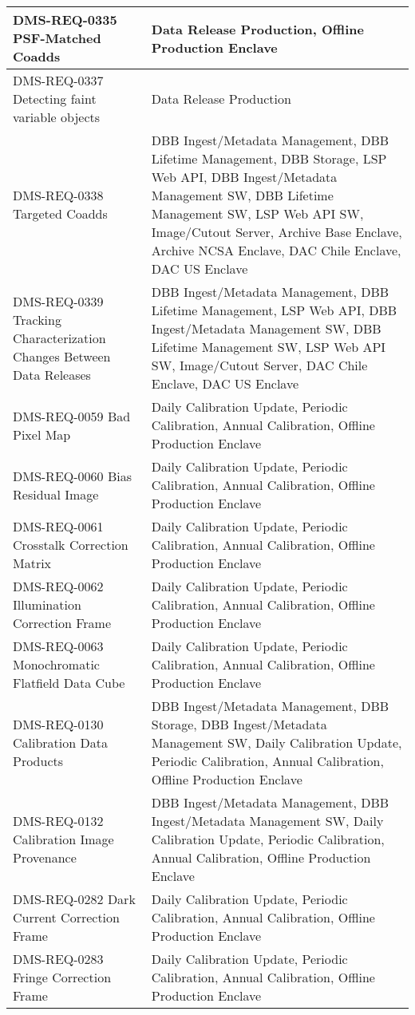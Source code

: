 \begin{xtabular}{p{0.4\textwidth}p{0.55\textwidth}}
DMS-REQ-0335 PSF-Matched Coadds & Data Release Production, Offline Production Enclave \\ \hline
DMS-REQ-0337 Detecting faint variable objects & Data Release Production \\ \hline
DMS-REQ-0338 Targeted Coadds & DBB Ingest/Metadata Management, DBB Lifetime Management, DBB Storage, LSP Web API, DBB Ingest/Metadata Management SW, DBB Lifetime Management SW, LSP Web API SW, Image/Cutout Server, Archive Base Enclave, Archive NCSA Enclave, DAC Chile Enclave, DAC US Enclave \\ \hline
DMS-REQ-0339 Tracking Characterization Changes Between Data Releases & DBB Ingest/Metadata Management, DBB Lifetime Management, LSP Web API, DBB Ingest/Metadata Management SW, DBB Lifetime Management SW, LSP Web API SW, Image/Cutout Server, DAC Chile Enclave, DAC US Enclave \\ \hline
DMS-REQ-0059 Bad Pixel Map & Daily Calibration Update, Periodic Calibration, Annual Calibration, Offline Production Enclave \\ \hline
DMS-REQ-0060 Bias Residual Image & Daily Calibration Update, Periodic Calibration, Annual Calibration, Offline Production Enclave \\ \hline
DMS-REQ-0061 Crosstalk Correction Matrix & Daily Calibration Update, Periodic Calibration, Annual Calibration, Offline Production Enclave \\ \hline
DMS-REQ-0062 Illumination Correction Frame & Daily Calibration Update, Periodic Calibration, Annual Calibration, Offline Production Enclave \\ \hline
DMS-REQ-0063 Monochromatic Flatfield Data Cube & Daily Calibration Update, Periodic Calibration, Annual Calibration, Offline Production Enclave \\ \hline
DMS-REQ-0130 Calibration Data Products & DBB Ingest/Metadata Management, DBB Storage, DBB Ingest/Metadata Management SW, Daily Calibration Update, Periodic Calibration, Annual Calibration, Offline Production Enclave \\ \hline
DMS-REQ-0132 Calibration Image Provenance & DBB Ingest/Metadata Management, DBB Ingest/Metadata Management SW, Daily Calibration Update, Periodic Calibration, Annual Calibration, Offline Production Enclave \\ \hline
DMS-REQ-0282 Dark Current Correction Frame & Daily Calibration Update, Periodic Calibration, Annual Calibration, Offline Production Enclave \\ \hline
DMS-REQ-0283 Fringe Correction Frame & Daily Calibration Update, Periodic Calibration, Annual Calibration, Offline Production Enclave \\ \hline

\end{xtabular}
